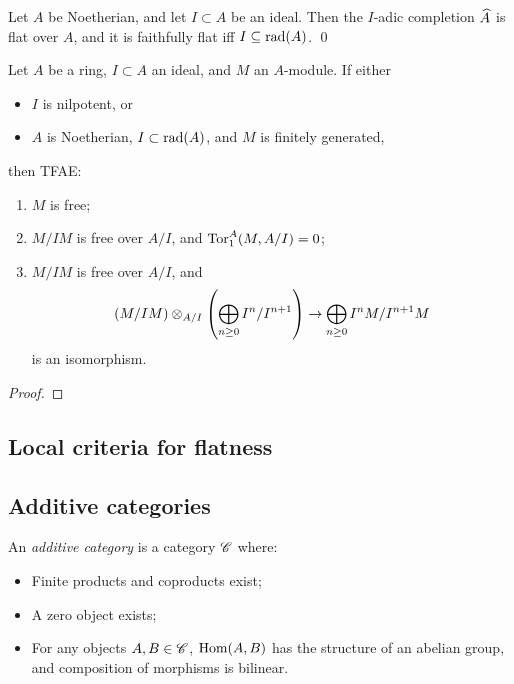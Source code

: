 \documentclass[11pt]{amsart}
\begin{document}
\begin{prop}
Let $A$ be Noetherian, and let $I\subset A$ be an ideal. Then the $I$-adic completion $\widehat{A}$ is flat over $A$, and it is faithfully flat iff $I\subseteq \operatorname{rad}(A)$. \qed
\end{prop}

\begin{prop}
    Let $A$ be a ring, $I\subset A$ an ideal, and $M$ an $A$-module. If either
    \begin{itemize}
        \item $I$ is nilpotent, or
        \item $A$ is Noetherian, $I\subset \operatorname{rad}(A)$, and $M$ is finitely generated,
    \end{itemize}
    then TFAE:
    \begin{enumerate}
        \item $M$ is free;
        \item $M/IM$ is free over $A/I$, and $\operatorname{Tor}_1^A(M,A/I) = 0$;
        \item $M/IM$ is free over $A/I$, and 
        \[(M/IM)\otimes_{A/I} \left( \bigoplus_{n\ge 0} I^n/I^{n+1} \right) \to \bigoplus_{n\ge 0} I^nM/I^{n+1}M\]
        is an isomorphism.
    \end{enumerate}
\end{prop}

\begin{proof}
    
\end{proof}



\subsection{Local criteria for flatness}


\subsection{Additive categories}

\begin{defn}
    An \emph{additive category} is a category $\mathscr{C}$ where:
    \begin{itemize}
        \item Finite products and coproducts exist;
        \item A zero object exists;
        \item For any objects $A,B\in \mathscr{C}$, $\operatorname{Hom}(A,B)$ has the structure of an abelian group, and composition of morphisms is bilinear.
    \end{itemize}
\end{defn}
\end{document}
